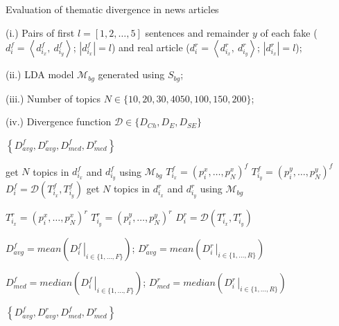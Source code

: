 \begin{algorithm}
\caption{Evaluation of thematic divergence in news articles}\label{4-divergence}
\begin{algorithmic}[1]

\Require
  {\begin{minipage}[t]{10cm}%
     \strut
     (i.) Pairs of first $l = [1, 2, \ldots, 5]$ sentences and remainder $y$ of each fake ($d_i^f = \left\langle d_{i_x}^f, \: d_{i_y}^f \right\rangle $; $ \left| d_{i_x}^f \right| = l$) and real article ($d_i^r = \left\langle d_{i_x}^r, \: d_{i_y}^r \right\rangle $; $ \left| d_{i_x}^r \right| = l$);

     (ii.) \ac{LDA} model $\mathscr{M}_{bg}$ generated using $S_{bg}$;

     (iii.) Number of topics $N \in \{ 10, 20, 30, 40 50, 100, 150, 200 \}$;

     (iv.) Divergence function $\mathscr{D} \in \{ D_{Ch}, D_E, D_{SE} \}$
     \strut
   \end{minipage}%
  }

\Ensure $ \left\{ D_{avg}^f, D_{avg}^r, D_{med}^f, D_{med}^r \right\}$
\item[]
    \State get $N$ topics in $d_{i_x}^f$ and $d_{i_y}^f$ using $\mathscr{M}_{bg}$
  \EndFor
  \State $T_{i_x}^f = \left( p_i^x, \ldots, p_N^x \right)^f$ 
  \State $T_{i_y}^f = \left( p_i^y, \ldots, p_N^y \right)^f$ 
  \State $ D_i^f = \mathscr{D} \left( T_{i_x}^f, T_{i_y}^f \right) $
    \State get $N$ topics in $d_{i_x}^r$ and $d_{i_y}^r$ using $\mathscr{M}_{bg}$
  \EndFor

  \State $T_{i_x}^r = \left( p_i^x, \ldots, p_N^x \right)^r$ 
  \State $T_{i_y}^r = \left( p_i^y, \ldots, p_N^y \right)^r$ 
  \State $ D_i^r = \mathscr{D} \left( T_{i_x}^r, T_{i_y}^r \right) $

  \State $D_{avg}^f = mean \left( \left.D_i^f\,\right\vert_{i \in \{1, \ldots, F\}} \right) $; \: $D_{avg}^r = mean \left( \left.D_i^r\,\right\vert_{i \in \{1, \ldots, R\}} \right) $

  \State $D_{med}^f = median \left( \left.D_i^f\,\right\vert_{i \in \{1, \ldots, F\}} \right) $; \: $D_{med}^r = median \left( \left.D_i^r\,\right\vert_{i \in \{1, \ldots, R\}} \right) $
\EndFor

\State\Return $ \left\{ D_{avg}^f, D_{avg}^r, D_{med}^f, D_{med}^r \right\}$
\end{algorithmic}
\end{algorithm}

